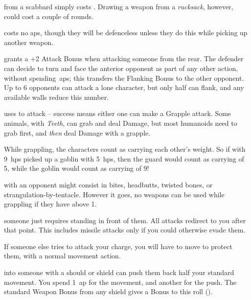 \begin{multicols}{2}
from a scabbard simply costs .
Drawing a weapon from a \textit{rucksack}, however, could cost a couple of \glspl{round}.

costs no \glspl{ap}, though they will be defenceless unless they do this while picking up another weapon.

grants a +2 Attack Bonus when attacking someone from the rear.
The defender can decide to turn and face the anterior opponent as part of any other action, without spending~\glspl{ap}; this transfers the Flanking Bonus to the other opponent.
Up to 6 opponents can attack a lone character, but only half can flank, and any available walls reduce this number.

\vspace{.5em}

uses  to attack -- success means either one can make a Grapple attack.
Some animals, with \textit{Teeth}, can grab and deal Damage, but most humanoids need to grab first, and \emph{then} deal Damage with a grapple.

While grappling, the characters count as carrying each other's \gls{weight}.
So if  with 9~\glspl{hp} picked up a goblin with 5~\glspl{hp}, then the \gls{guard} would count as carrying  of 5, while the goblin would count as carrying  of 9!

\label{grappling}
with an opponent might consist in bites, headbutts, twisted bones, or strangulation-by-tentacle.
However it goes, no weapons can be used while grappling if they have  above 1.

someone just requires standing in front of them.
All attacks redirect to you after that point.
This includes missile attacks only if you could otherwise evade them.

If someone else tries to attack your charge, you will have to move to protect them, with a normal movement action.

into someone with a should or shield can push them back half your standard movement.
You spend 1~\gls{ap} for the movement, and another for the push.
The standard Weapon Bonus from any shield gives a Bonus to this roll ().


\end{multicols}
